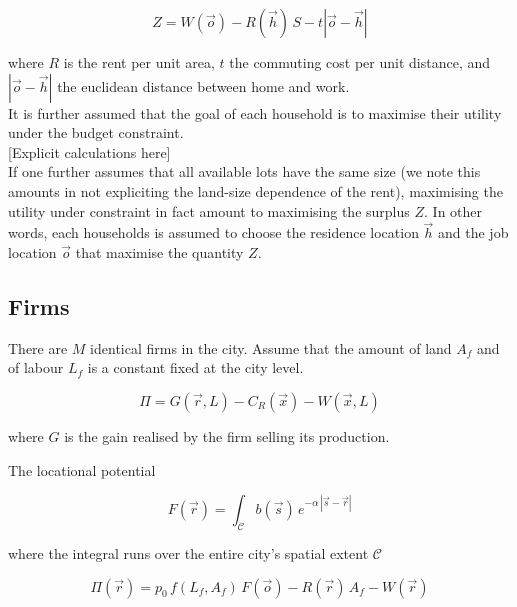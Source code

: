 \begin{equation}
    Z = W\left(\vec{o}\right) - R(\vec{h})\,S - t \left| \vec{o} - \vec{h} \right|
\end{equation}

where $R$ is the rent per unit area, $t$ the commuting cost per unit distance,
and $\left| \vec{o} - \vec{h} \right|$ the euclidean distance between home and
work.\\

It is further assumed that the goal of each household is to maximise their
utility under the budget constraint.\\

[Explicit calculations here]\\

If one further assumes that all available lots have the same size (we note this
amounts in not expliciting the land-size dependence of the rent), maximising the
utility under constraint in fact amount to maximising the surplus $Z$. In other
words, each households is assumed to choose the residence location $\vec{h}$ and
the job location $\vec{o}$ that maximise the quantity $Z$.


\subsection{Firms}
\label{sub:firms}

There are $M$ identical firms in the city. Assume that the amount of land $A_f$ and of
labour $L_f$ is a constant fixed at the city level.

\begin{equation}
    \Pi = G(\vec{r}, L) - C_R(\vec{x}) -  W(\vec{x}, L)
\end{equation}

where $G$ is the gain realised by the firm selling its production. 

The locational potential

\begin{equation}
    F\left(\vec{r}\right) = \int_{\mathcal{C}}
    b(\vec{s})\,e^{-\alpha\,\left|\vec{s}-\vec{r}\right|}
\end{equation}

where the integral runs over the entire city's spatial extent $\mathcal{C}$

\begin{equation}
    \Pi\left(\vec{r}\right) = p_0\,f(L_f, A_f)\,F(\vec{o}) - R(\vec{r})\,A_f - W(\vec{r})
\end{equation}

